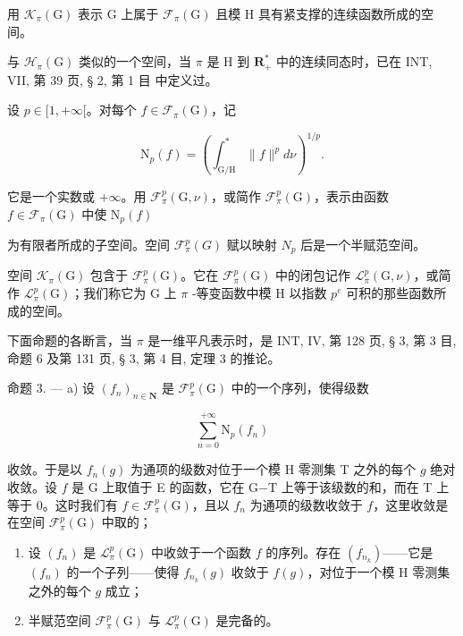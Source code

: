 用 \(\mathcal{K}_{\pi}(\mathrm{G})\) 表示 G 上属于 \(\mathcal{F}_{\pi}(\mathrm{G})\) 且模 H 具有紧支撑的连续函数所成的空间。

与 \(\mathcal{H}_{\pi}(\mathrm{G})\) 类似的一个空间，当 \(\pi\) 是 H 到 \(\mathbf{R}_{+}^{*}\) 中的连续同态时，已在 INT, VII, 第 39 页, § 2, 第 1 目 中定义过。

设 \(p \in [1, +\infty[\)。对每个 \(f \in \mathcal{F}_{\pi}(\mathrm{G})\)，记

\[
\mathrm{N} _ {p} (f) = \left(\int_ {\mathrm{G/H}} ^ {*} \| f \| ^ {p} d \nu\right) ^ {1 / p}.
\]

它是一个实数或 \(+\infty\)。用 \(\mathcal{F}_{\pi}^{p}(\mathrm{G},\nu)\)，或简作 \(\mathcal{F}_{\pi}^{p}(\mathrm{G})\)，表示由函数 \(f\in \mathcal{F}_{\pi}(\mathrm{G})\) 中使 \(\mathrm{N}_p(f)\)

为有限者所成的子空间。空间 \(\mathcal{F}_{\pi}^{p}(G)\) 赋以映射 \(N_{p}\) 后是一个半赋范空间。

空间 \(\mathcal{K}_{\pi}(\mathrm{G})\) 包含于 \(\mathcal{F}_{\pi}^{p}(\mathrm{G})\)。它在 \(\mathcal{F}_{\pi}^{p}(\mathrm{G})\) 中的闭包记作 \(\mathcal{L}_{\pi}^{p}(\mathrm{G},\nu)\)，或简作 \(\mathcal{L}_{\pi}^{p}(\mathrm{G})\)；我们称它为 G 上 \(\pi\) -等变函数中模 H 以指数 \(p^{e}\) 可积的那些函数所成的空间。

下面命题的各断言，当 \(\pi\) 是一维平凡表示时，是 INT, IV, 第 128 页, § 3, 第 3 目, 命题 6 及第 131 页, § 3, 第 4 目, 定理 3 的推论。

命题 3. --- a) 设 \((f_n)_{n \in \mathbf{N}}\) 是 \(\mathcal{F}_\pi^p(\mathrm{G})\) 中的一个序列，使得级数

\[
\sum_ {n = 0} ^ {+ \infty} \mathrm{N} _ {p} (f _ {n})
\]

收敛。于是以 \(f_n(g)\) 为通项的级数对位于一个模 H 零测集 T 之外的每个 \(g\) 绝对收敛。设 \(f\) 是 G 上取值于 E 的函数，它在 G−T 上等于该级数的和，而在 T 上等于 0。这时我们有 \(f \in \mathcal{F}_\pi^p(\mathrm{G})\)，且以 \(f_n\) 为通项的级数收敛于 \(f\)，这里收敛是在空间 \(\mathcal{F}_\pi^p(\mathrm{G})\) 中取的；

\begin{enumerate}
\def\labelenumi{\alph{enumi})}
\setcounter{enumi}{1}
\item
  设 \((f_n)\) 是 \(\mathcal{L}_{\pi}^{p}(\mathrm{G})\) 中收敛于一个函数 \(f\) 的序列。存在 \((f_{n_k})\)——它是 \((f_n)\) 的一个子列——使得 \(f_{n_k}(g)\) 收敛于 \(f(g)\)，对位于一个模 H 零测集之外的每个 \(g\) 成立；
\item
  半赋范空间 \(\mathcal{F}_{\pi}^{p}(\mathrm{G})\) 与 \(\mathcal{L}_{\pi}^{p}(\mathrm{G})\) 是完备的。
\end{enumerate}

